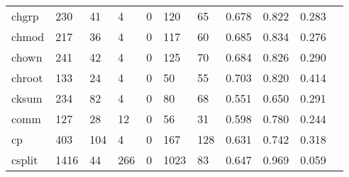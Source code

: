 \begin{longtable}{lp{1.10cm}p{1.10cm}p{1.10cm}p{1.10cm}p{1.10cm}p{1.10cm}p{1.10cm}p{1.10cm}p{1.10cm}p{1.10cm}}
chgrp     &                    230 &                                 41 &                                 4 &                                0 &                               120 &                              65 &                          0.678 &                                 0.822 &                               0.283 \\
chmod     &                    217 &                                 36 &                                 4 &                                0 &                               117 &                              60 &                          0.685 &                                 0.834 &                               0.276 \\
chown     &                    241 &                                 42 &                                 4 &                                0 &                               125 &                              70 &                          0.684 &                                 0.826 &                               0.290 \\
chroot    &                    133 &                                 24 &                                 4 &                                0 &                                50 &                              55 &                          0.703 &                                 0.820 &                               0.414 \\
cksum     &                    234 &                                 82 &                                 4 &                                0 &                                80 &                              68 &                          0.551 &                                 0.650 &                               0.291 \\
comm      &                    127 &                                 28 &                                12 &                                0 &                                56 &                              31 &                          0.598 &                                 0.780 &                               0.244 \\
cp        &                    403 &                                104 &                                 4 &                                0 &                               167 &                             128 &                          0.631 &                                 0.742 &                               0.318 \\
csplit    &                   1416 &                                 44 &                               266 &                                0 &                              1023 &                              83 &                          0.647 &                                 0.969 &                               0.059 \\

\end{longtable}
